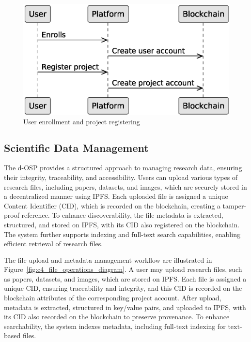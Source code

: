 \documentclass[final]{rc-book-2.14}
\begin{document}
\begin{figure}[htbp]
    \centering
    \includegraphics[scale=0.5]{fig/c4_platform_operations_1.eps}
    \caption{User enrollment and project registering}
    \label{fig:c4_operations_1}
\end{figure}

\subsection{Scientific Data Management}

The d-OSP provides a structured approach to managing research data, ensuring their integrity, traceability, and accessibility. Users can upload various types of research files, including papers, datasets, and images, which are securely stored in a decentralized manner using IPFS. Each uploaded file is assigned a unique Content Identifier (CID), which is recorded on the blockchain, creating a tamper-proof reference. To enhance discoverability, the file metadata is extracted, structured, and stored on IPFS, with its CID also registered on the blockchain. The system further supports indexing and full-text search capabilities, enabling efficient retrieval of research files.

The file upload and metadata management workflow are illustrated in Figure~\ref{fig:c4_file_operations_diagram}. A user may upload research files, such as papers, datasets, and images, which are stored on IPFS. Each file is assigned a unique CID, ensuring traceability and integrity, and this CID is recorded on the blockchain attributes of the corresponding project account. After upload, metadata is extracted, structured in key/value pairs, and uploaded to IPFS, with its CID also recorded on the blockchain to preserve provenance. To enhance searchability, the system indexes metadata, including full-text indexing for text-based files.
\end{document}
